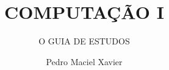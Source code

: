 \documentclass[br]{textbook}
\title{COMPUTAÇÃO I}
\author{Pedro Maciel Xavier}
\subtitle{O GUIA DE ESTUDOS}
\begin{document}
    \frontmatter
    \titlepage
    
    
    \titlepage

    \mainmatter
    \tableofcontents
    

    \backmatter
    \appendix
    
    
\end{document}

